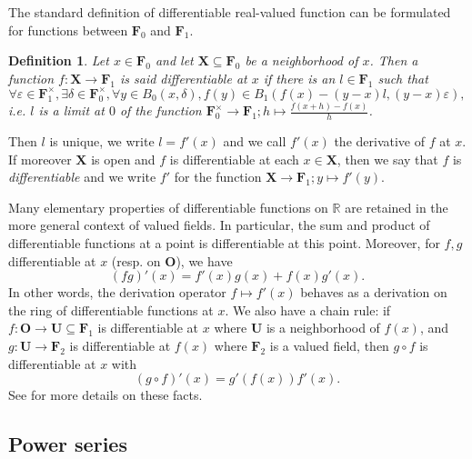 \documentclass{article}
\newcommand{\of}{:}
\newcommand{\tmem}[1]{{\em #1\/}}
\newtheorem{definition}[theorem]{Definition}
\theoremstyle{remark}\newtheorem*{convention*}{Convention}
\begin{document}
The standard definition of differentiable real-valued function can be
formulated for functions between $\mathbf{F}_0$ and $\mathbf{F}_1$.

\begin{definition}
  Let $x \in \mathbf{F}_0$ and let $\mathbf{X} \subseteq \mathbf{F}_0$ be a
  neighborhood of $x$. Then a function $f \of \mathbf{X} \longrightarrow
  \mathbf{F}_1$ is said differentiable at $x$ if there is an $l \in
  \mathbf{F}_1$ such that
  \[ \forall \varepsilon \in \mathbf{F}_1^{\times}, \exists \delta \in
     \mathbf{F}_0^{\times}, \forall y \in B_0 (x, \delta), f (y) \in B_1 (f
     (x) - (y - x) l, (y - x) \varepsilon), \]
  i.e. $l$ is a limit at $0$ of the function $\mathbf{F}_0^{\times}
  \longrightarrow \mathbf{F}_1 ; h \mapsto \frac{f (x + h) - f (x)}{h}$.
\end{definition}

Then $l$ is unique, we write $l = f' (x)$ and we call $f' (x)$ the derivative
of $f$ at $x$. If moreover $\mathbf{X}$ is open and $f$ is differentiable at
each $x \in \mathbf{X}$, then we say that $f$ is
{\tmem{differentiable}}{} and we write $f'$ for
the function $\mathbf{X} \longrightarrow \mathbf{F}_1 ; y \mapsto f' (y)$.

Many elementary properties of differentiable functions on $\mathbb{R}$ are
retained in the more general context of valued fields. In particular, the sum
and product of differentiable functions at a point is differentiable at this
point. Moreover, for $f, g$ differentiable at $x$ (resp. on $\mathbf{O}$), we
have
\[ (fg)' (x) = f' (x) g (x) + f (x) g' (x) . \]
In other words, the derivation operator $f \mapsto f' (x)$ behaves as a
derivation on the ring of differentiable functions at $x$. We also have a
chain rule: if $f \of \mathbf{O} \longrightarrow \mathbf{U} \subseteq
\mathbf{F}_1$ is differentiable at $x$ where $\mathbf{U}$ is a neighborhood of
$f (x)$, and $g \of \mathbf{U} \longrightarrow \mathbf{F}_2$ is differentiable
at $f (x)$ where $\mathbf{F}_2$ is a valued field, then $g \circ f$ is
differentiable at $x$ with
\begin{equation}
  (g \circ f)' (x) = g' (f (x)) f' (x) . \label{eq-chain-rule-functions}
\end{equation}
See {\cite{BGM}} for more details on these facts.

\subsection{Power series}
\end{document}
